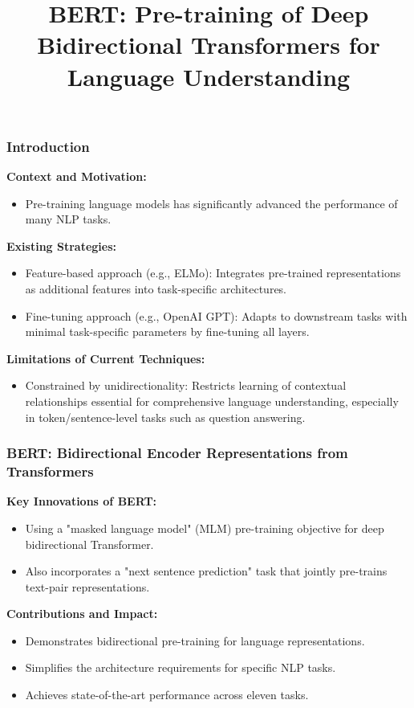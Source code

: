 \documentclass[11pt,xcolor={dvipsnames},hyperref={pdftex,pdfpagemode=UseNone,hidelinks,pdfdisplaydoctitle=true},usepdftitle=false]{beamer}
\begin{document}
\title{\textbf{BERT}: Pre-training of Deep Bidirectional Transformers for \\ Language Understanding}
%
\frame{\titlepage}

\begin{frame}
\frametitle{Introduction}
\textbf{Context and Motivation:}
\begin{itemize}
    \item Pre-training language models has significantly advanced the performance of many NLP tasks.
\end{itemize}
\textbf{Existing Strategies:}
\begin{itemize}
    \item Feature-based approach (e.g., ELMo): Integrates pre-trained representations as additional features into task-specific architectures.
    \item Fine-tuning approach (e.g., OpenAI GPT): Adapts to downstream tasks with minimal task-specific parameters by fine-tuning all layers.
\end{itemize}
\textbf{Limitations of Current Techniques:}
\begin{itemize}
    \item Constrained by unidirectionality:  Restricts learning of contextual relationships essential for comprehensive language understanding, especially in token/sentence-level tasks such
    as question answering.
\end{itemize}
\end{frame}

\begin{frame}
\frametitle{BERT: Bidirectional Encoder Representations from Transformers}
\textbf{Key Innovations of BERT:}
\begin{itemize}
    \item Using a "masked language model" (MLM) pre-training objective for deep bidirectional Transformer.
    \item Also incorporates a "next sentence prediction" task that jointly pre-trains text-pair representations.
\end{itemize}
\textbf{Contributions and Impact:}
\begin{itemize}
    \item Demonstrates bidirectional pre-training for language representations.
    \item Simplifies the architecture requirements for specific NLP tasks.
    \item Achieves state-of-the-art performance across eleven tasks.
\end{itemize}
\end{frame}
    
\end{document}
